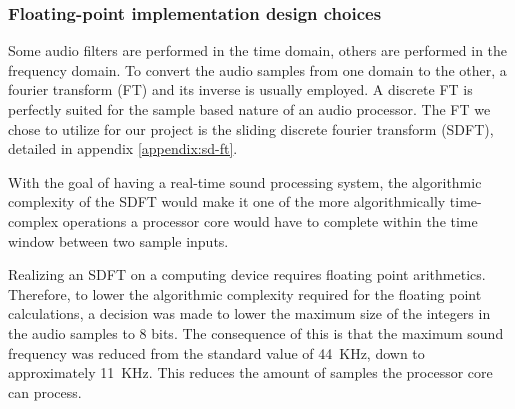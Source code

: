 \subsubsection{Floating-point implementation design choices}

Some audio filters are performed in the time domain, others are performed in the
frequency domain. To convert the audio samples from one domain to the other, a
fourier transform (FT) and its inverse is usually employed. A discrete FT is
perfectly suited for the sample based nature of an audio processor. The FT we
chose to utilize for our project is the
sliding discrete fourier transform (SDFT), detailed in appendix \ref{appendix:sd-ft}.

With the goal of having a real-time sound processing system, the algorithmic
complexity of the SDFT would make it one of the more algorithmically
time-complex operations a processor core would have to complete within the
time window between two sample inputs.

Realizing an SDFT on a computing device requires floating point arithmetics.
Therefore, to lower the algorithmic complexity required for the floating point
calculations, a decision was made to lower the maximum size of the integers in
the audio samples to 8 bits. The consequence of this is that the maximum sound
frequency was reduced from the standard value of 44~KHz, down to approximately 11~KHz.
This reduces the amount of samples the processor core can process.


